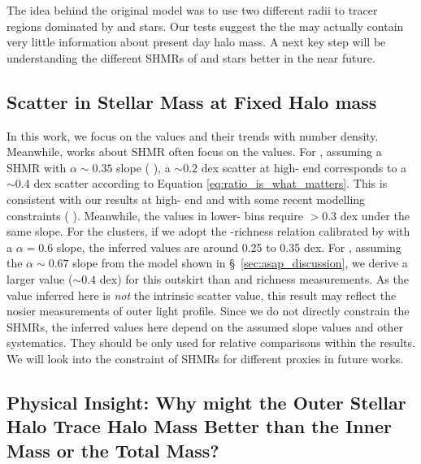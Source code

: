 \documentclass[fleqn,usenatbib,useAMS]{mnras}
\begin{document}
\begin{CJK*}{UTF8}{gbsn}
    The idea behind the original \asap{} model was to use two different radii to tracer regions 
    dominated by \insitu{} and \exsitu{} stars. Our \topn{} tests suggest the the \insitu{} may
    actually contain very little information about present day halo mass. 
    A next key step will be understanding the different SHMRs of \insitu{} and \exsitu{} stars
    better in the near future.

\subsection{Scatter in Stellar Mass at Fixed Halo mass}
    \label{sec:sigma_mstar}
    
    In this work, we focus on the \sigmvir{} values and their trends with number density. 
    Meanwhile, works about SHMR often focus on the \sigms{} values.
    For , assuming a SHMR with $\alpha \sim 0.35$ slope (\eg{} \citealt{GoldenMarx2019,
    Huang2020}), a \sigms{}$\sim 0.2$ dex scatter at high-\mvir{} end corresponds to a 
    \sigmvir{}$\sim 0.4$ dex scatter according to Equation \ref{eq:ratio_is_what_matters}.
    This is consistent with our results at high-\mvir{} end and with some recent modelling
    constraints (\eg{} \citealt{Kravtsov2018, Behroozi2018}). 
    Meanwhile, the \sigmvir{} values in lower-\mvir{} bins require \sigms{}$>0.3$ dex under the 
    same slope. 
    For the \camira{} clusters, if we adopt the \mvir{}-richness relation calibrated by 
    \citet{Murata2019} with a $\alpha = 0.6$ slope, the inferred \sigms{} values are around 
    0.25 to 0.35 dex. 
    For , assuming the $\alpha \sim 0.67$ slope from the \asap{} model shown
    in \S\ \ref{sec:asap_discussion}, we derive a larger \sigms{} value ($\sim 0.4$ dex) for this
    outskirt \mstar{} than  and richness measurements. 
    As the \sigms{} value inferred here is \emph{not} the intrinsic scatter value, this result 
    may reflect the nosier measurements of outer light profile.
    Since we do not directly constrain the SHMRs, the inferred \sigms{} values here depend on the
    assumed slope values and other systematics.
    They should be only used for relative comparisons within the \topn{} results.
    We will look into the constraint of SHMRs for different \mvir{} proxies in future works.
    

\subsection{Physical Insight: Why might the Outer Stellar Halo Trace Halo Mass Better than the Inner
    Mass or the Total Mass?}
    \label{sec:outskirt_discussion}


\end{CJK*}
\end{document}
